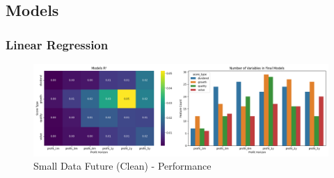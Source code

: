 \documentclass[11pt,english,a4paper,hidelinks]{book}
\begin{document}
\subsection{Models}

\subsubsection{Linear Regression}

\begin{figure}[H]
    \centering
    \includegraphics[width=1\textwidth]{images/code/models/linear_regression/first_model/basic_models_summary.png}
    \caption{Small Data Future (Clean) - Performance}
    \label{fig:first_linear_regression_performance}
\end{figure}
\end{document}
